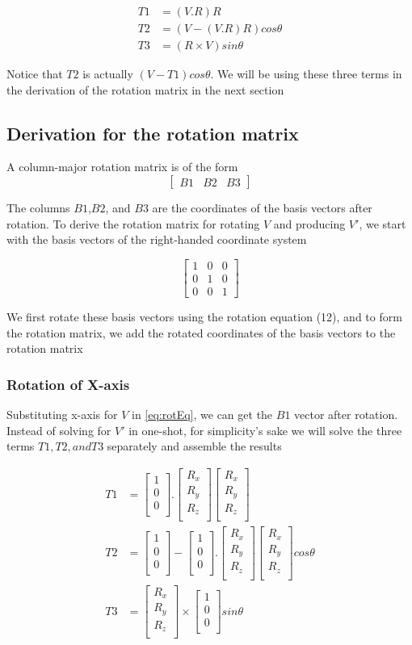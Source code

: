 \documentclass{article}
\newcommand{\xaxis}{
    \begin{bmatrix}
        1 \\
        0 \\
        0 \\
    \end{bmatrix}
}
\newcommand{\rotAxis}{
    \begin{bmatrix}
        R_x \\
        R_y \\
        R_z \\
    \end{bmatrix}
}
\newcommand{\vparallelForX}{
    \xaxis . \rotAxis 
    \rotAxis
}
\begin{document}
    \begin{align}
        T1 &= (V.R) R \\
        T2 &= (V - (V.R) R) cos\theta \\
        T3 &= (R \times V) sin\theta
    \end{align}

    \noindent Notice that $T2$ is actually $(V-T1) cos\theta$. We will be using these three terms in the derivation of the rotation matrix in the next section


    \subsection*{Derivation for the rotation matrix}

    A column-major rotation matrix is of the form
    \[
        \begin{bmatrix}
            B1 & B2 & B3
        \end{bmatrix}
    \]

    \noindent The columns $B1$,$B2$, and $B3$ are the coordinates of the basis vectors after rotation. To derive the rotation matrix for rotating $V$ and producing $V'$, we start with the basis vectors of the right-handed coordinate system

    \[
        \begin{bmatrix}
            1 & 0 & 0 \\
            0 & 1 & 0 \\
            0 & 0 & 1
        \end{bmatrix}
    \]

    \noindent We first rotate these basis vectors using the rotation equation (12), and to form the rotation matrix, we add the rotated coordinates of the basis vectors to the rotation matrix

    \subsubsection*{Rotation of X-axis}

    Substituting x-axis for $V$ in \ref{eq:rotEq}, we can get the $B1$ vector after rotation. Instead of solving for $V'$ in one-shot, for simplicity's sake we will solve the three terms $T1,T2, and T3$ separately and assemble the results 
   
    \begin{align}
        T1 &= \vparallelForX \\
        T2 &= \xaxis - \vparallelForX cos\theta \\
        T3 &= \rotAxis \times \xaxis sin\theta 
    \end{align}
\end{document}
